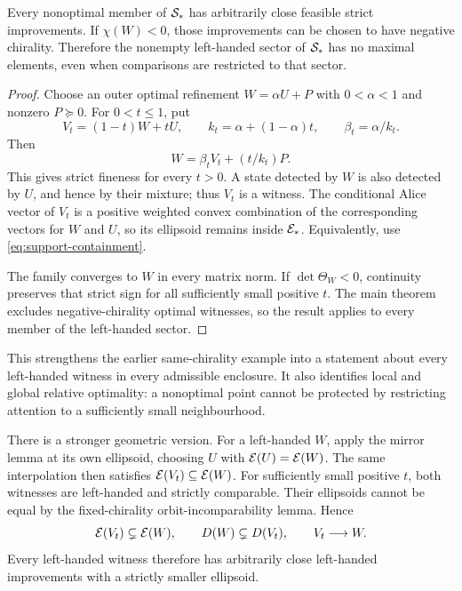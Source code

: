 \begin{theorem}\label{thm:local}
Every nonoptimal member of $\mathcal S_*$ has arbitrarily close feasible strict improvements. If $\chi(W)<0$, those improvements can be chosen to have negative chirality. Therefore the nonempty left-handed sector of $\mathcal S_*$ has no maximal elements, even when comparisons are restricted to that sector.
\end{theorem}
\begin{proof}
Choose an outer optimal refinement $W=\alpha U+P$ with $0<\alpha<1$ and nonzero $P\succeq0$. For $0<t\leq1$, put
\[
 V_t=(1-t)W+tU,\qquad k_t=\alpha+(1-\alpha)t,
 \qquad\beta_t=\alpha/k_t.
\]
Then
\begin{equation}\label{eq:interpolation}
 W=\beta_tV_t+(t/k_t)P.
\end{equation}
This gives strict fineness for every $t>0$. A state detected by $W$ is also detected by $U$, and hence by their mixture; thus $V_t$ is a witness. The conditional Alice vector of $V_t$ is a positive weighted convex combination of the corresponding vectors for $W$ and $U$, so its ellipsoid remains inside $\mathcal E_*$. Equivalently, use \eqref{eq:support-containment}.

The family converges to $W$ in every matrix norm. If $\det\Theta_W<0$, continuity preserves that strict sign for all sufficiently small positive $t$. The main theorem excludes negative-chirality optimal witnesses, so the result applies to every member of the left-handed sector.
\end{proof}

This strengthens the earlier same-chirality example into a statement about every left-handed witness in every admissible enclosure. It also identifies local and global relative optimality: a nonoptimal point cannot be protected by restricting attention to a sufficiently small neighbourhood.

There is a stronger geometric version. For a left-handed $W$, apply the mirror lemma at its own ellipsoid, choosing $U$ with $\mathcal E(U)=\mathcal E(W)$. The same interpolation then satisfies $\mathcal E(V_t)\subseteq\mathcal E(W)$. For sufficiently small positive $t$, both witnesses are left-handed and strictly comparable. Their ellipsoids cannot be equal by the fixed-chirality orbit-incomparability lemma. Hence
\[
 \mathcal E(V_t)\subsetneq\mathcal E(W),\qquad D(W)\subsetneq D(V_t),\qquad V_t\longrightarrow W.
\]
Every left-handed witness therefore has arbitrarily close left-handed improvements with a strictly smaller ellipsoid.

